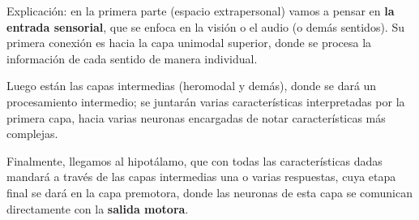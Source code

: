 Explicación: en la primera parte (espacio extrapersonal) vamos a pensar en \textbf{la entrada sensorial}, que se enfoca en la visión o el audio (o demás sentidos). Su primera conexión es hacia la capa unimodal superior, donde se procesa la información de cada sentido de manera individual.

Luego están las capas intermedias (heromodal y demás), donde se dará un procesamiento intermedio; se juntarán varias características interpretadas por la primera capa, hacia varias neuronas encargadas de notar características más complejas.

Finalmente, llegamos al hipotálamo, que con todas las características dadas mandará a través de las capas intermedias una o varias respuestas, cuya etapa final se dará en la capa premotora, donde las neuronas de esta capa se comunican directamente con la \textbf{salida motora}.







